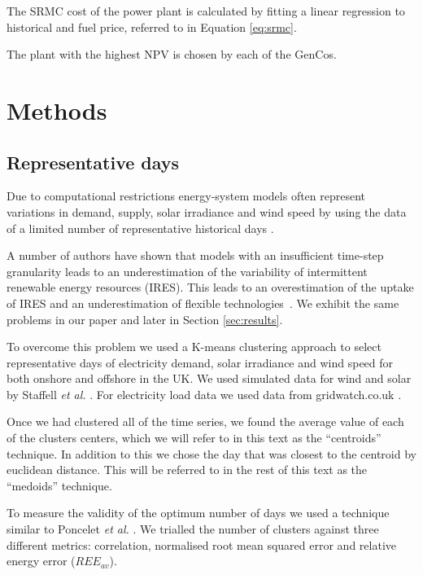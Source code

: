 \documentclass[final,3p,times,twocolumn,numbers]{elsarticle}
\begin{document}
The SRMC cost of the power plant is calculated by fitting a linear regression to historical  and fuel price, referred to in Equation \ref{eq:srmc}. 

The plant with the highest NPV is chosen by each of the GenCos.
 
\section{Methods}
\label{sec:methods}
\subsection{Representative days}
\label{ssec:representative_days}
Due to computational restrictions energy-system models often represent variations in demand, supply, solar irradiance and wind speed by using the data of a limited number of representative historical days \cite{Poncelet2017}.

A number of authors have shown that models with an insufficient time-step granularity leads to an underestimation of the variability of intermittent renewable energy resources (IRES). This leads to an overestimation of the uptake of IRES and an underestimation of flexible technologies~\cite{Ludig2011,Haydt2011}. We exhibit the same problems in our paper \cite{Kell} and later in Section \ref{sec:results}.

To overcome this problem we used a K-means clustering approach to select representative days of electricity demand, solar irradiance and wind speed for both onshore and offshore in the UK. We used simulated data for wind and solar by Staffell \textit{et al.} \cite{Staffell2016}. For electricity load data we used data from gridwatch.co.uk \cite{gridwatch}.

Once we had clustered all of the time series, we found the average value of each of the clusters centers, which we will refer to in this text as the ``centroids'' technique. In addition to this we chose the day that was closest to the centroid by euclidean distance. This will be referred to in the rest of this text as the ``medoids'' technique.

To measure the validity of the optimum number of days we used a technique similar to Poncelet \textit{et al.} \cite{Dhaeseleer2015, Poncelet2017}. We trialled the number of clusters against three different metrics: correlation, normalised root mean squared error and relative energy error ($REE_{av}$). 
\end{document}
